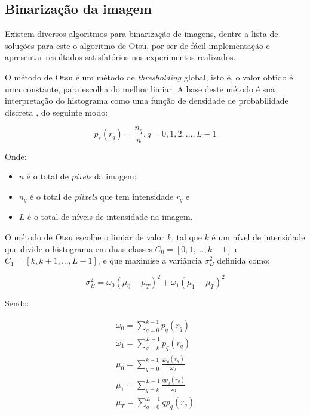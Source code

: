 \documentclass[12pt]{article}
\begin{document}
\subsection{Binarização da imagem}

Existem diversos algoritmos para binarização de imagens, dentre a lista de soluções para este  o algoritmo de Otsu, por ser de fácil implementação e apresentar resultados satisfatórios nos experimentos realizados.

O método de Otsu é um método de \textit{thresholding} global, isto é, o valor obtido é
uma constante, para escolha do melhor limiar. A base deste método é sua interpretação
do histograma como uma função de densidade de probabilidade
discreta \cite{Limiar}, do seguinte modo:

\begin{equation}\label{eq:histograma_norm}
  p_r(r_q) = \frac{n_q}{n}, q = 0, 1, 2, ..., L-1
\end{equation}

Onde:

\begin{itemize}
  \item $ n $ é o total de \textit{pixels} da imagem;
  \item $ n_q $ é o total de \textit{piixels} que tem intensidade $ r_q $ e
  \item $ L $ é o total de níveis de intensidade na imagem.
\end{itemize}

O método de Otsu escolhe o limiar de valor $ k $, tal que $ k $ é um nível de
intensidade que divide o histograma em duas classes
$ C_0 = [0, 1, ..., k-1] $ e $ C_1 = [k, k+1, ..., L-1] $, e que maximise a
variância $ \sigma_{B}^2 $ definida como:

\begin{equation}\label{eq:maximizacao_variancia}
  \sigma_{B}^2 = \omega_0(\mu_0 - \mu_T)^2 + \omega_1(\mu_1 - \mu_T)^2
\end{equation}

Sendo:

\begin{subequations}\label{eq:somatorios_maximizacao}
\begin{align}
  \omega_0 = \sum_{q=0}^{k-1} p_q(r_q)\\
  \omega_1 = \sum_{q=k}^{L-1} p_q(r_q)\\
     \mu_0 = \sum_{q=0}^{k-1} \frac{qp_q(r_q)}{\omega_0}\\
     \mu_1 = \sum_{q=k}^{L-1} \frac{qp_q(r_q)}{\omega_1}\\
     \mu_T = \sum_{q=0}^{L-1} qp_q(r_q)
\end{align}
\end{subequations}
\end{document}
